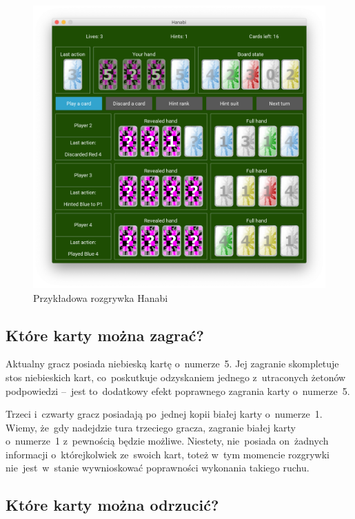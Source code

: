 \documentclass[declaration,shortabstract,inz]{iithesis}
\begin{document}
\begin{figure}[H]
	\centering
	\captionsetup{format=hang}
	\includegraphics[width=\textwidth,height=\textheight,keepaspectratio]{example.png}
	\caption[Caption]{Przykładowa rozgrywka Hanabi}
	\label{fig:example}
\end{figure}

\subsection*{Które karty można zagrać?}

Aktualny gracz posiada niebieską kartę o~numerze~5. Jej zagranie skompletuje stos niebieskich kart, co~poskutkuje odzyskaniem jednego z~utraconych żetonów podpowiedzi --~jest to~dodatkowy efekt poprawnego zagrania karty o~numerze~5.

Trzeci i~czwarty gracz posiadają po~jednej kopii białej karty o~numerze~1. Wiemy, że~gdy nadejdzie tura trzeciego gracza, zagranie białej karty o~numerze~1 z~pewnością będzie możliwe. Niestety, nie~posiada on~żadnych informacji o~którejkolwiek ze~swoich kart, toteż w~tym momencie rozgrywki nie~jest~w~stanie wywnioskować poprawności wykonania takiego ruchu.

\subsection*{Które karty można odrzucić?}
\end{document}
